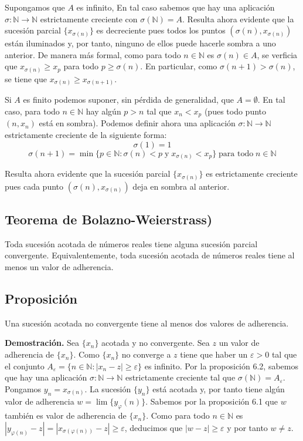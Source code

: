 \documentclass[10pt,a4paper]{article}
\begin{document}
	Supongamos que $A$ es infinito, En tal caso sabemos que hay una aplicación $\sigma : \mathbb{N} \rightarrow \mathbb{N}$ estrictamente creciente con $\sigma(\mathbb{N}) = A$. Resulta ahora evidente que la sucesión parcial $\{x_{\sigma(n)}\}$ es decreciente pues todos los puntos $(\sigma(n), x_{\sigma(n)})$ están iluminados y, por tanto, ninguno de ellos puede hacerle sombra a uno anterior. De manera más formal, como para todo $n \in \mathbb{N}$ es $\sigma(n) \in A$, se verficia que $x_{\sigma(n)} \geq x_p$ para todo $p \geq \sigma(n)$. En particular, como $\sigma(n+1) > \sigma(n)$, se tiene que $x_{\sigma(n)} \geq x_{\sigma(n+1)}$.
	
	Si $A$ es finito podemos suponer, sin pérdida de generalidad, que $A = \emptyset$. En tal caso, para todo $n \in \mathbb{N}$ hay algún $p > n$ tal que $x_n < x_p$ (pues todo punto $(n, x_n)$ está en sombra). Podemos definir ahora una aplicación $\sigma : \mathbb{N} \rightarrow \mathbb{N}$ estrictamente creciente de la siguiente forma: 
	$$ \sigma(1) = 1$$
	$$\sigma(n+1) = \min\{p \in \mathbb{N} : \sigma(n) < p \; \text{y} \; x_{\sigma(n)} < x_p\} \; \text{para todo} \; n \in \mathbb{N}$$
	
	Resulta ahora evidente que la sucesión parcial $\{x_{\sigma(n)}\}$ es estrictamente creciente pues cada punto $(\sigma(n), x_{\sigma(n)})$ deja en sombra al anterior.
	
	\subsection{Teorema de Bolazno-Weierstrass)}
	
	Toda sucesión acotada de números reales tiene alguna sucesión parcial convergente. Equivalentemente, toda sucesión acotada de números
	reales tiene al menos un valor de adherencia.

	
	\subsection{Proposición}
	
	Una sucesión acotada no convergente tiene al menos dos valores de adherencia.
	
	\textbf{Demostración. }Sea $\{x_n\}$ acotada y no convergente. Sea $z$ un valor de adherencia de $\{x_n\}$. Como $\{x_n\}$ no converge a $z$ tiene que haber un $\varepsilon > 0$ tal que el conjunto $A_\varepsilon = \{n \in \mathbb{N}: |x_n - z| \geq \varepsilon\}$ es infinito. Por la proposición 6.2, sabemos que hay una aplicación $\sigma : \mathbb{N} \rightarrow \mathbb{N}$ estrictamente creciente tal que $\sigma(\mathbb{N}) = A_\varepsilon$. Pongamos $y_n = x_{\sigma(n)}$. La sucesión $\{y_n\}$ está acotada y, por tanto tiene algún valor de adherencia $w = \lim\{y_\varphi(n)\}$. Sabemos por la proposición 6.1 que $w$ también es valor de adherencia de $\{x_n\}$. Como para todo $n \in \mathbb{N}$ es $|y_{\varphi(n)} - z | = |x_{\sigma(\varphi(n))} - z | \geq \varepsilon$, deducimos que $|w - z | \geq \varepsilon$ y por tanto $w \neq z$.
	
\end{document}
